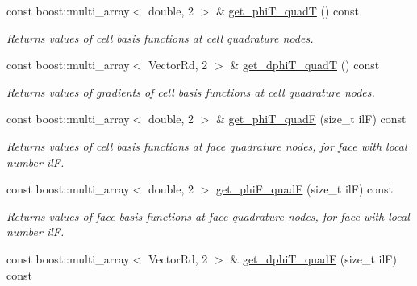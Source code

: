 \begin{DoxyCompactItemize}
const boost\+::multi\+\_\+array$<$ double, 2 $>$ \& \hyperlink{classHArDCore3D_1_1ElementQuad_aa56cdde521a902082ce050928893804d}{get\+\_\+phi\+T\+\_\+quadT} () const
\begin{DoxyCompactList}\small\item\em Returns values of cell basis functions at cell quadrature nodes. \end{DoxyCompactList}\item 
\mbox{\label{classHArDCore3D_1_1ElementQuad_a4a585d06f102a8c04ebffc1f8541e778}} 
const boost\+::multi\+\_\+array$<$ Vector\+Rd, 2 $>$ \& \hyperlink{classHArDCore3D_1_1ElementQuad_a4a585d06f102a8c04ebffc1f8541e778}{get\+\_\+dphi\+T\+\_\+quadT} () const
\begin{DoxyCompactList}\small\item\em Returns values of gradients of cell basis functions at cell quadrature nodes. \end{DoxyCompactList}\item 
\mbox{\label{classHArDCore3D_1_1ElementQuad_a34cbdbaafb9fe8681474b11bc8ebfd93}} 
const boost\+::multi\+\_\+array$<$ double, 2 $>$ \& \hyperlink{classHArDCore3D_1_1ElementQuad_a34cbdbaafb9fe8681474b11bc8ebfd93}{get\+\_\+phi\+T\+\_\+quadF} (size\+\_\+t ilF) const
\begin{DoxyCompactList}\small\item\em Returns values of cell basis functions at face quadrature nodes, for face with local number ilF. \end{DoxyCompactList}\item 
\mbox{\label{classHArDCore3D_1_1ElementQuad_a561b60cc7997268260b7cd05edce20d9}} 
const boost\+::multi\+\_\+array$<$ double, 2 $>$ \hyperlink{classHArDCore3D_1_1ElementQuad_a561b60cc7997268260b7cd05edce20d9}{get\+\_\+phi\+F\+\_\+quadF} (size\+\_\+t ilF) const
\begin{DoxyCompactList}\small\item\em Returns values of face basis functions at face quadrature nodes, for face with local number ilF. \end{DoxyCompactList}\item 
\mbox{\label{classHArDCore3D_1_1ElementQuad_a023175342dd0e23426348ebe2445b7cc}} 
const boost\+::multi\+\_\+array$<$ Vector\+Rd, 2 $>$ \& \hyperlink{classHArDCore3D_1_1ElementQuad_a023175342dd0e23426348ebe2445b7cc}{get\+\_\+dphi\+T\+\_\+quadF} (size\+\_\+t ilF) const

\end{DoxyCompactItemize}
